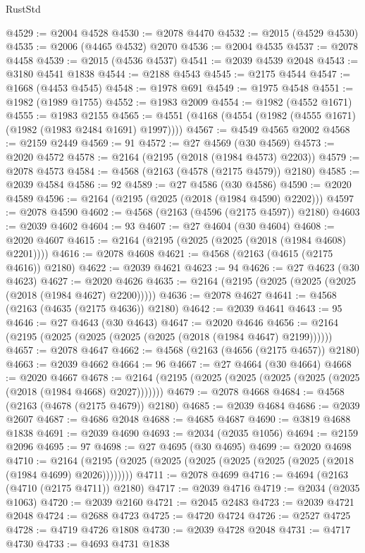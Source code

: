 \begin{lexlean}{RustStd}
\begin{coremodule}
@4529 := @2004 @4528
@4530 := @2078 @4470
@4532 := @2015 (@4529 @4530)
@4535 := @2006 (@4465 @4532) @2070
@4536 := @2004 @4535
@4537 := @2078 @4458
@4539 := @2015 (@4536 @4537)
@4541 := @2039 @4539 @2048
@4543 := @3180 @4541 @1838
@4544 := @2188 @4543
@4545 := @2175 @4544
@4547 := @1668 (@4453 @4545)
@4548 := @1978 @691
@4549 := @1975 @4548
@4551 := @1982 (@1989 @1755)
@4552 := @1983 @2009
@4554 := @1982 (@4552 @1671)
@4555 := @1983 @2155
@4565 := @4551 (@4168 (@4554 (@1982 (@4555 @1671) (@1982 (@1983 @2484 @1691) @1997))))
@4567 := @4549 @4565 @2002
@4568 := @2159 @2449
@4569 := 91
@4572 := @27 @4569 (@30 @4569)
@4573 := @2020 @4572
@4578 := @2164 (@2195 (@2018 (@1984 @4573) @2203))
@4579 := @2078 @4573
@4584 := @4568 (@2163 (@4578 (@2175 @4579)) @2180)
@4585 := @2039 @4584
@4586 := 92
@4589 := @27 @4586 (@30 @4586)
@4590 := @2020 @4589
@4596 := @2164 (@2195 (@2025 (@2018 (@1984 @4590) @2202)))
@4597 := @2078 @4590
@4602 := @4568 (@2163 (@4596 (@2175 @4597)) @2180)
@4603 := @2039 @4602
@4604 := 93
@4607 := @27 @4604 (@30 @4604)
@4608 := @2020 @4607
@4615 := @2164 (@2195 (@2025 (@2025 (@2018 (@1984 @4608) @2201))))
@4616 := @2078 @4608
@4621 := @4568 (@2163 (@4615 (@2175 @4616)) @2180)
@4622 := @2039 @4621
@4623 := 94
@4626 := @27 @4623 (@30 @4623)
@4627 := @2020 @4626
@4635 := @2164 (@2195 (@2025 (@2025 (@2025 (@2018 (@1984 @4627) @2200)))))
@4636 := @2078 @4627
@4641 := @4568 (@2163 (@4635 (@2175 @4636)) @2180)
@4642 := @2039 @4641
@4643 := 95
@4646 := @27 @4643 (@30 @4643)
@4647 := @2020 @4646
@4656 := @2164 (@2195 (@2025 (@2025 (@2025 (@2025 (@2018 (@1984 @4647) @2199))))))
@4657 := @2078 @4647
@4662 := @4568 (@2163 (@4656 (@2175 @4657)) @2180)
@4663 := @2039 @4662
@4664 := 96
@4667 := @27 @4664 (@30 @4664)
@4668 := @2020 @4667
@4678 := @2164 (@2195 (@2025 (@2025 (@2025 (@2025 (@2025 (@2018 (@1984 @4668) @2027)))))))
@4679 := @2078 @4668
@4684 := @4568 (@2163 (@4678 (@2175 @4679)) @2180)
@4685 := @2039 @4684
@4686 := @2039 @2607
@4687 := @4686 @2048
@4688 := @4685 @4687
@4690 := @3819 @4688 @1838
@4691 := @2039 @4690
@4693 := @2034 (@2035 @1056)
@4694 := @2159 @2096
@4695 := 97
@4698 := @27 @4695 (@30 @4695)
@4699 := @2020 @4698
@4710 := @2164 (@2195 (@2025 (@2025 (@2025 (@2025 (@2025 (@2025 (@2018 (@1984 @4699) @2026))))))))
@4711 := @2078 @4699
@4716 := @4694 (@2163 (@4710 (@2175 @4711)) @2180)
@4717 := @2039 @4716
@4719 := @2034 (@2035 @1063)
@4720 := @2039 @2160
@4721 := @2045 @2483
@4723 := @2039 @4721 @2048
@4724 := @2688 @4723
@4725 := @4720 @4724
@4726 := @2527 @4725
@4728 := @4719 @4726 @1808
@4730 := @2039 @4728 @2048
@4731 := @4717 @4730
@4733 := @4693 @4731 @1838

\end{coremodule}
\end{lexlean}
